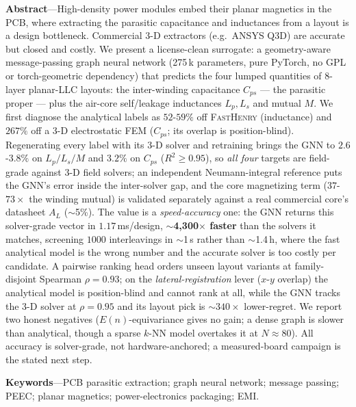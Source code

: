 \documentclass[letterpaper,twocolumn,9pt]{extarticle}
\begin{document}
\noindent\textbf{Abstract}---High-density power modules embed their planar magnetics
in the PCB, where extracting the parasitic capacitance and inductances from a
layout is a design bottleneck. Commercial 3-D extractors (e.g.\ ANSYS Q3D) are
accurate but closed and costly. We present a license-clean surrogate: a
geometry-aware message-passing graph neural network (275\,k parameters, pure
PyTorch, no GPL or torch-geometric dependency) that predicts the four lumped
quantities of 8-layer planar-LLC layouts: the inter-winding capacitance $C_{ps}$
--- the parasitic proper --- plus the air-core self/leakage inductances $L_p,L_s$
and mutual $M$. We
first diagnose the analytical labels as $52$-$59\%$ off \textsc{FastHenry}
(inductance) and $267\%$ off a 3-D electrostatic FEM ($C_{ps}$; its overlap is
position-blind). Regenerating every label with its 3-D solver and retraining
brings the GNN to $2.6$-$3.8\%$ on $L_p/L_s/M$ and $3.2\%$ on $C_{ps}$
($R^2\!\ge\!0.95$), so \emph{all four} targets are field-grade
against 3-D field solvers; an independent Neumann-integral reference puts the
GNN's error inside the inter-solver gap, and the core magnetizing term
($37$-$73\times$ the winding mutual) is validated separately against a real
commercial core's datasheet $A_L$ ($\sim$5\%). The value is a
\emph{speed-accuracy} one: the GNN returns this solver-grade vector in
$1.17$\,ms/design, $\sim$\textbf{4{,}300$\times$ faster} than the solvers it
matches, screening $1000$ interleavings in $\sim$1\,s rather than $\sim$1.4\,h,
where the fast analytical model is the wrong number and the accurate solver is
too costly per candidate. A pairwise ranking head orders unseen layout variants
at family-disjoint Spearman $\rho=0.93$; on the \emph{lateral-registration} lever
($x$-$y$ overlap) the analytical model is position-blind and cannot rank at all,
while the GNN tracks the 3-D solver at $\rho=0.95$ and its layout pick is
$\sim$$340\times$ lower-regret. We report two honest negatives ($E(n)$-equivariance
gives no gain; a dense graph is slower than analytical, though a sparse $k$-NN
model overtakes it at $N\!\approx\!80$). All accuracy is solver-grade, not
hardware-anchored; a measured-board campaign is the stated next step.

\vspace{3pt}
\noindent\textbf{Keywords}---PCB parasitic extraction; graph neural network; message
passing; PEEC; planar magnetics; power-electronics packaging; EMI.
\end{document}
